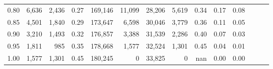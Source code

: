 \begin{tabular}{rrrrrrrrrrrrrr}
0.80 &   6,636 &  2,436 &  0.27 &  169,146 &   11,099 &  28,206 &   5,619 &  0.34 &  0.17 &      0.08 \\
0.85 &   4,501 &  1,840 &  0.29 &  173,647 &    6,598 &  30,046 &   3,779 &  0.36 &  0.11 &      0.05 \\
0.90 &   3,210 &  1,493 &  0.32 &  176,857 &    3,388 &  31,539 &   2,286 &  0.40 &  0.07 &      0.03 \\
0.95 &   1,811 &    985 &  0.35 &  178,668 &    1,577 &  32,524 &   1,301 &  0.45 &  0.04 &      0.01 \\
1.00 &   1,577 &  1,301 &  0.45 &  180,245 &        0 &  33,825 &       0 &   nan &  0.00 &      0.00 \\
\bottomrule
\end{tabular}
